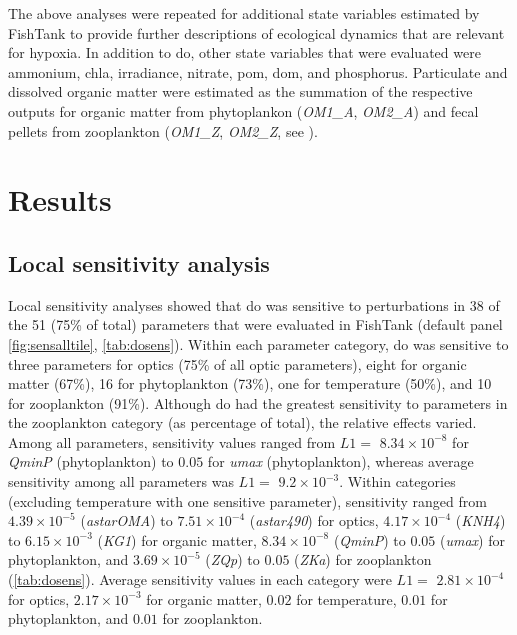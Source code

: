 \documentclass[letterpaper,12pt,oneside]{article}\usepackage[]{graphicx}\usepackage[]{color}
\begin{document}
The above analyses were repeated for additional state variables estimated by FishTank to provide further descriptions of ecological dynamics that are relevant for hypoxia.  In addition to \ac{do}, other state variables that were evaluated were ammonium, \ac{chla}, irradiance, nitrate, \ac{pom}, \ac{dom}, and phosphorus.  Particulate and dissolved organic matter were estimated as the summation of the respective outputs for organic matter from phytoplankon (\textit{OM1\_A}, \textit{OM2\_A}) and fecal pellets from zooplankton (\textit{OM1\_Z}, \textit{OM2\_Z}, see ). 

\section{Results}


 
\subsection{Local sensitivity analysis}

Local sensitivity analyses showed that \ac{do} was sensitive to perturbations in 38 of the 51 (75\% of total) parameters that were evaluated in FishTank (default panel \cref{fig:sensalltile}, \cref{tab:dosens}). Within each parameter category, \ac{do} was sensitive to three parameters for optics (75\% of all optic parameters), eight for organic matter (67\%), 16 for phytoplankton (73\%), one for temperature (50\%), and 10 for zooplankton (91\%). Although \ac{do} had the greatest sensitivity to parameters in the zooplankton category (as percentage of total), the relative effects varied. Among all parameters, sensitivity values ranged from $L1 = $ $8.34\times 10^{-8}$ for \textit{QminP} (phytoplankton) to $0.05$ for \textit{umax} (phytoplankton), whereas average sensitivity among all parameters was $L1 = $ $9.2\times 10^{-3}$. Within categories (excluding temperature with one sensitive parameter), sensitivity ranged from $4.39\times 10^{-5}$ (\textit{astarOMA}) to $7.51\times 10^{-4}$ (\textit{astar490}) for optics, $4.17\times 10^{-4}$ (\textit{KNH4}) to $6.15\times 10^{-3}$ (\textit{KG1}) for organic matter, $8.34\times 10^{-8}$ (\textit{QminP}) to $0.05$ (\textit{umax}) for phytoplankton, and $3.69\times 10^{-5}$ (\textit{ZQp}) to $0.05$ (\textit{ZKa}) for zooplankton (\cref{tab:dosens}).  Average sensitivity values in each category were $L1 = $ $2.81\times 10^{-4}$ for optics, $2.17\times 10^{-3}$ for organic matter, $0.02$ for temperature, $0.01$ for phytoplankton, and $0.01$ for zooplankton.
\end{document}
